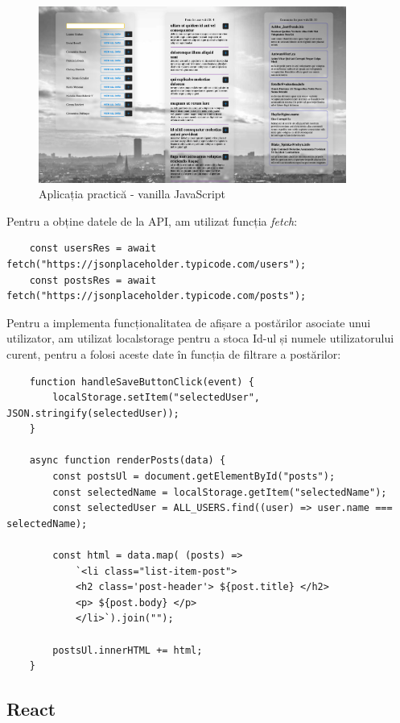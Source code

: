 \documentclass[12pt, a4paper]{report}
\begin{document}
\begin{figure}[htbp]
	\centering
	\includegraphics[width=0.9\textwidth]{01_desktop_preview.png}
	\caption{Aplicația practic\u a - vanilla JavaScript}
	\label{fig:preview-vanillajs}
\end{figure}

Pentru a obține datele de la API, am utilizat funcția  \emph{fetch}:
\begin{lstlisting}
	const usersRes = await fetch("https://jsonplaceholder.typicode.com/users");
	const postsRes = await fetch("https://jsonplaceholder.typicode.com/posts");
\end{lstlisting}

Pentru a implementa funcționalitatea de afișare a post\u arilor asociate unui utilizator, am utilizat localstorage pentru a stoca Id-ul și numele utilizatorului curent, pentru a folosi aceste date în funcția de filtrare a post\u arilor:
\begin{lstlisting}
	function handleSaveButtonClick(event) {
		localStorage.setItem("selectedUser", JSON.stringify(selectedUser));
	}

	async function renderPosts(data) {
		const postsUl = document.getElementById("posts");
		const selectedName = localStorage.getItem("selectedName");
  		const selectedUser = ALL_USERS.find((user) => user.name === selectedName);

		const html = data.map( (posts) => 
			`<li class="list-item-post"> 
			<h2 class='post-header'> ${post.title} </h2>
			<p> ${post.body} </p>
			</li>`).join("");

	  	postsUl.innerHTML += html;
	}

\end{lstlisting}
\subsection{React}
\end{document}
